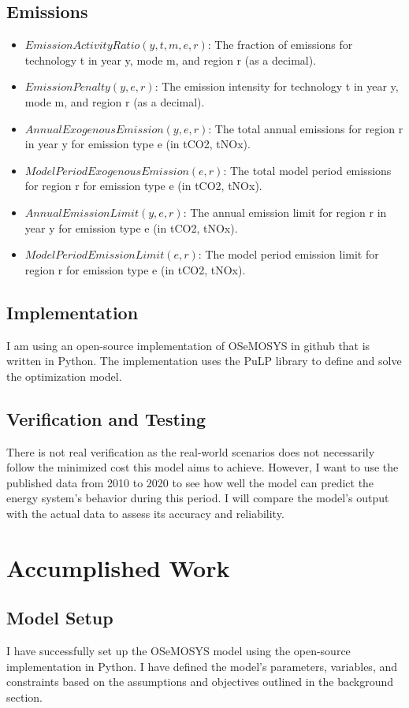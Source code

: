 \documentclass[11pt]{article}
\begin{document}
\subsection{Emissions}
\begin{itemize}
    \item $EmissionActivityRatio(y,t,m,e,r)$: The fraction of emissions for technology t in year y, mode m, and region r (as a decimal).
    \item $EmissionPenalty(y,e,r)$: The emission intensity for technology t in year y, mode m, and region r (as a decimal).
    \item $AnnualExogenousEmission(y,e,r)$: The total annual emissions for region r in year y for emission type e (in tCO2, tNOx).
    \item $ModelPeriodExogenousEmission(e,r)$: The total model period emissions for region r for emission type e (in tCO2, tNOx).
    \item $AnnualEmissionLimit(y,e,r)$: The annual emission limit for region r in year y for emission type e (in tCO2, tNOx).
    \item $ModelPeriodEmissionLimit(e,r)$: The model period emission limit for region r for emission type e (in tCO2, tNOx).
\end{itemize}

\subsection{Implementation}
I am using an open-source implementation of OSeMOSYS in github \cite{githubrepo} that is written in Python. The implementation uses the PuLP library to define and solve the optimization model.

\subsection{Verification and Testing}
There is not real verification as the real-world scenarios does not necessarily follow the minimized cost this model aims to achieve. However, I want to use the published data from 2010 to 2020 to see how well the model can predict the energy system's behavior during this period. I will compare the model's output with the actual data to assess its accuracy and reliability.


\section{Accumplished Work}
\subsection{Model Setup}
I have successfully set up the OSeMOSYS model using the open-source implementation in Python. I have defined the model's parameters, variables, and constraints based on the assumptions and objectives outlined in the background section.
\end{document}
